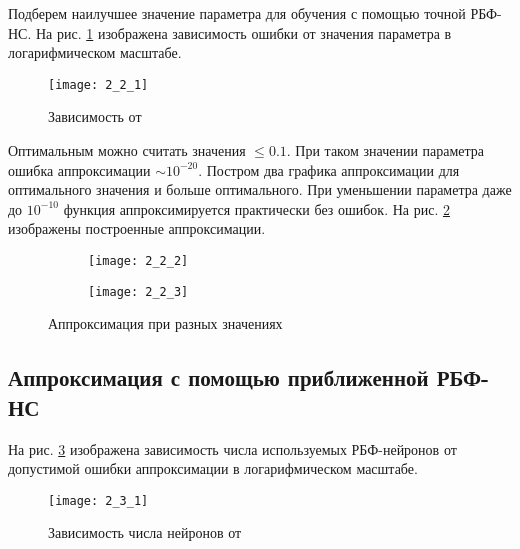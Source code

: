 Подберем наилучшее значение параметра  для обучения с помощью точной РБФ-НС. На рис. \ref{fig:2_2_1} изображена зависимость ошибки  от значения параметра  в логарифмическом масштабе. 
\begin{figure}[H]
\begin{center}
	\texttt{[image: 2\_2\_1]}
	\caption{Зависимость  от }
	\label{fig:2_2_1}
\end{center}
\end{figure}

Оптимальным можно считать значения  $\leq 0.1$. При таком значении параметра ошибка аппроксимации $\sim 10^{-20}$. Постром два графика аппроксимации для оптимального значения  и больше оптимального. При уменьшении параметра даже до $10^{-10}$ функция аппроксимируется практически без ошибок. На рис. \ref{fig:2_2_2} изображены построенные аппроксимации.
\begin{figure}[H]
\begin{center}
	\begin{subfigure}{0.49\textwidth}
		\texttt{[image: 2\_2\_2]}
		\caption{}
	\end{subfigure}
	\begin{subfigure}{0.49\textwidth}
		\texttt{[image: 2\_2\_3]}
		\caption{}
	\end{subfigure}
	\caption{Аппроксимация при разных значениях }
	\label{fig:2_2_2}
\end{center}
\end{figure}

\subsection{Аппроксимация с помощью приближенной РБФ-НС}


На рис. \ref{fig:2_3_1} изображена зависимость числа используемых РБФ-нейронов от допустимой ошибки аппроксимации  в логарифмическом масштабе.
\begin{figure}[H]
\begin{center}
	\texttt{[image: 2\_3\_1]}
	\caption{Зависимость числа нейронов от }
	\label{fig:2_3_1}
\end{center}
\end{figure}

